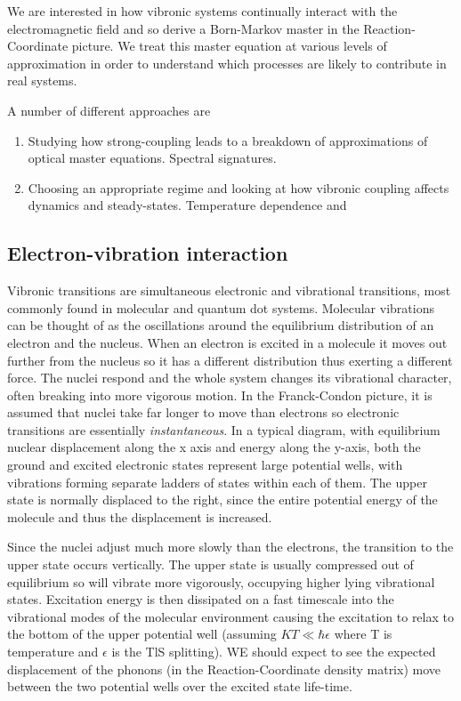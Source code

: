 \documentclass[]{article}
\begin{document}
We are interested in how vibronic systems continually interact with the electromagnetic field and so derive a Born-Markov master in the Reaction-Coordinate picture. We treat this master equation at various levels of approximation in order to understand which processes are likely to contribute in real systems.

A number of different approaches are
\begin{enumerate}
	\item Studying how strong-coupling leads to a breakdown of approximations of optical master equations. Spectral signatures.
	\item Choosing an appropriate regime and looking at how vibronic coupling affects dynamics and steady-states. Temperature dependence and 
\end{enumerate}

\subsection{Electron-vibration interaction}

Vibronic transitions are simultaneous electronic and vibrational transitions, most commonly found in molecular and quantum dot systems. Molecular vibrations can be thought of as the oscillations around the equilibrium distribution of an electron and the nucleus. When an electron is excited in a molecule it moves out further from the nucleus so it has a different distribution thus exerting a different force. The nuclei respond and the whole system changes its vibrational character, often breaking into more vigorous motion. In the Franck-Condon picture, it is assumed that nuclei take far longer to move than electrons so electronic transitions are essentially \emph{instantaneous}. In a typical diagram, with equilibrium nuclear displacement along the x axis and energy along the y-axis, both the ground and excited electronic states represent large potential wells, with vibrations forming separate ladders of states within each of them. The upper state is normally displaced to the right, since the entire potential energy of the molecule and thus the displacement is increased.

Since the nuclei adjust much more slowly than the electrons, the transition to the upper state occurs vertically. The upper state is usually compressed out of equilibrium so will vibrate more vigorously, occupying higher lying vibrational states. Excitation energy is then dissipated on a fast timescale into the vibrational modes of the molecular environment causing the excitation to relax to the bottom of the upper potential well (assuming $KT\ll\hbar\epsilon$ where T is temperature and $\epsilon$ is the TlS splitting). WE should expect to see the expected displacement of the phonons (in the Reaction-Coordinate density matrix) move between the two potential wells over the excited state life-time.
\end{document}

